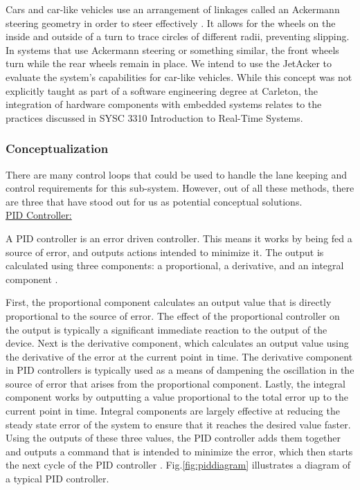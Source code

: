 \documentclass[titlepage,draft]{article}
\begin{document}
{Cars and car-like vehicles use an arrangement of linkages called an Ackermann steering geometry in order to steer effectively \cite{AckermannSteer}. It allows for the wheels on the inside and outside of a turn to trace circles of different radii, preventing slipping. In systems that use Ackermann steering or something similar, the front wheels turn while the rear wheels remain in place. We intend to use the JetAcker to evaluate the system’s capabilities for car-like vehicles. While this concept was not explicitly taught as part of a software engineering degree at Carleton, the integration of hardware components with embedded systems relates to the practices discussed in SYSC 3310 Introduction to Real-Time Systems.

\subsubsection{Conceptualization}
\label{KCConcept}

There are many control loops that could be used to handle the lane keeping and control requirements for this sub-system. However, out of all these methods, there are three that have stood out for us as potential conceptual solutions.
\\

\underline{PID Controller:}

A PID controller is an error driven controller. This means it works by being fed a source of error, and outputs actions intended to minimize it. The output is calculated using three components: a proportional, a derivative, and an integral component \cite{pid_explanation}. 

First, the proportional component calculates an output value that is directly proportional to the source of error. The effect of the proportional controller on the output is typically a significant immediate reaction to the output of the device. Next is the derivative component, which calculates an output value using the derivative of the error at the current point in time. The derivative component in PID controllers is typically used as a means of dampening the oscillation in the source of error that arises from the proportional component. Lastly, the integral component works by outputting a value proportional to the total error up to the current point in time. Integral components are largely effective at reducing the steady state error of the system to ensure that it reaches the desired value faster.  Using the outputs of these three values, the PID controller adds them together and outputs a command that is intended to minimize the error, which then starts the next cycle of the PID controller \cite{pid_explanation}. Fig.\ref{fig:piddiagram} illustrates a diagram of a typical PID controller.\\

}
\end{document}
